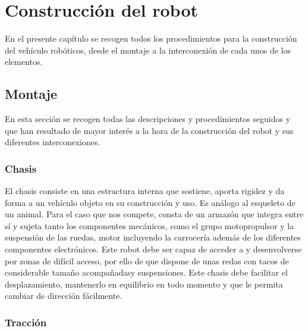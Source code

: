 

\newpage

\chapter{Construcción del robot}
\label{chap:robot_construccion}


En el presente capítulo se recogen todos los procedimientos para la construcción del vehículo robóticos, desde el montaje a la interconexión de cada unos de los elementos.\\

\section{Montaje}

En esta sección se recogen todas las descripciones y procedimientos seguidos y que han resultado de mayor interés a la hora de la construcción del robot y 
sus diferentes interconexiones.\\

\subsection{Chasis}

El chasis consiste en una estructura interna que sostiene, aporta rigidez y da forma a un vehículo objeto en su construcción y uso. Es análogo al esqueleto de un animal.
Para el caso que nos compete, consta de un armazón​ que integra entre sí y sujeta tanto los componentes mecánicos, como el grupo motopropulsor y la suspensión de las ruedas,
motor incluyendo la carrocería además de los diferentes componentes electrónicos.​ Este robot debe ser capaz de acceder a y desenvolverse por zonas de difícil acceso, por ello de que dispone de unas redas con tacos de considerable tamaño 
acompañadasy suspensiones. Este chasis debe  facilitar el  desplazamiento, mantenerlo en equilibrio en todo momento y que le permita cambiar de dirección fácilmente.

\subsection{Tracción}

